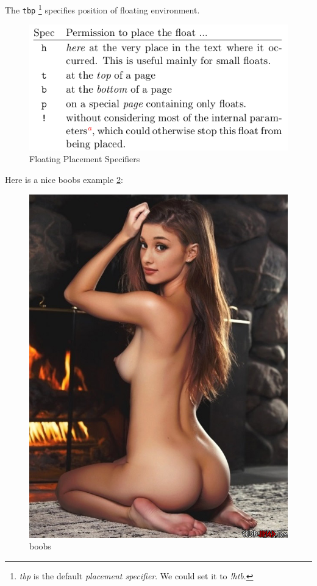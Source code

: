 The \verb|tbp| \footnote{\textit{tbp} is the default
  \textit{placement specifier}. We could set it to
  \textit{!htb}.} specifies position of floating environment.

\begin{figure}[h]
  \centering
  \includegraphics[width=.5\textwidth]{floating}
  \caption{Floating Placement Specifiers}
  \label{fig:placement-specifiers}
\end{figure}

Here is a nice boobs example \ref{fig:boobs}:

\begin{figure}[!htb]
  \centering
  \includegraphics[scale=.3]{boobs}
  \caption{boobs}
  \label{fig:boobs}
\end{figure}

